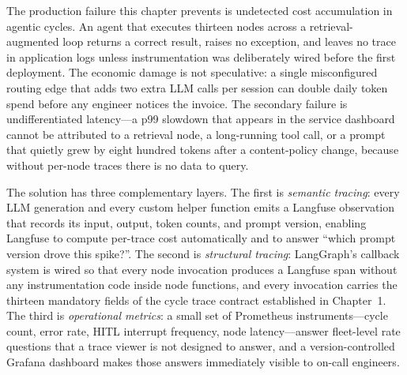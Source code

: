 

The production failure this chapter prevents is undetected cost
accumulation in agentic cycles. An agent that executes thirteen nodes
across a retrieval-augmented loop returns a correct result, raises no
exception, and leaves no trace in application logs unless instrumentation
was deliberately wired before the first deployment. The economic damage
is not speculative: a single misconfigured routing edge that adds two
extra LLM calls per session can double daily token spend before any
engineer notices the invoice. The secondary failure is undifferentiated
latency---a p99 slowdown that appears in the service dashboard cannot be
attributed to a retrieval node, a long-running tool call, or a prompt
that quietly grew by eight hundred tokens after a content-policy change,
because without per-node traces there is no data to query.

The solution has three complementary layers. The first is
\emph{semantic tracing}: every LLM generation and every custom helper
function emits a Langfuse observation that records its input, output,
token counts, and prompt version, enabling Langfuse to compute
per-trace cost automatically and to answer ``which prompt version drove
this spike?''. The second is \emph{structural tracing}: LangGraph's
callback system is wired so that every node invocation produces a
Langfuse span without any instrumentation code inside node functions,
and every invocation carries the thirteen mandatory fields of the cycle
trace contract established in Chapter~1. The third is \emph{operational
metrics}: a small set of Prometheus instruments---cycle count, error
rate, HITL interrupt frequency, node latency---answer fleet-level
rate questions that a trace viewer is not designed to answer, and a
version-controlled Grafana dashboard makes those answers immediately
visible to on-call engineers.

